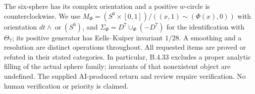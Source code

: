 The six-sphere has its complex orientation and a positive $w$-circle
is counterclockwise. We use
$M_\Phi=(S^6\times[0,1])/((x,1)\sim(\Phi(x),0))$ with orientation
$dt\wedge\operatorname{or}(S^6)$, and
$\Sigma_\Phi=D^7\cup_\Phi(-D^7)$ for the identification with
$\Theta_7$; its positive generator has Eells--Kuiper invariant $1/28$.
A smoothing and a resolution are distinct operations throughout.
All requested items are proved or refuted in their stated categories.
In particular, B.4.33 excludes a proper analytic filling of the
actual sphere family; invariants of that nonexistent object are
undefined. The supplied AI-produced return and review require
verification. No human verification or priority is claimed.
